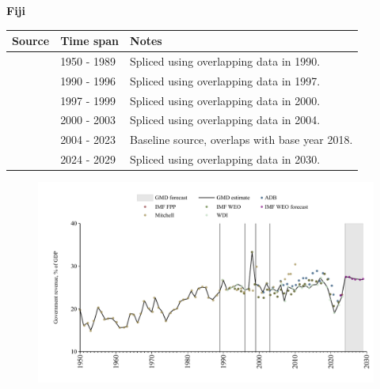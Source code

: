 \documentclass[12pt,a4paper,landscape]{article}
\begin{document}
\begin{adjustbox}{max totalsize={\paperwidth}{\paperheight},center}
\begin{minipage}[t][\textheight][t]{\textwidth}
\vspace*{0.5cm}
{}
\begin{center}
{\Large\bfseries Fiji}
\end{center}
\vspace{0.5cm}
\begin{table}[H]
\centering
\small
\begin{tabular}{|l|l|l|}
\hline
\textbf{Source} & \textbf{Time span} & \textbf{Notes} \\
\hline
\rowcolor{white}\cite{Mitchell}& 1950 - 1989 &Spliced using overlapping data in 1990.\\
\rowcolor{lightgray}\cite{WDI}& 1990 - 1996 &Spliced using overlapping data in 1997.\\
\rowcolor{white}\cite{IMF_WEO}& 1997 - 1999 &Spliced using overlapping data in 2000.\\
\rowcolor{lightgray}\cite{ADB}& 2000 - 2003 &Spliced using overlapping data in 2004.\\
\rowcolor{white}\cite{WDI}& 2004 - 2023 &Baseline source, overlaps with base year 2018.\\
\rowcolor{lightgray}\cite{IMF_WEO_forecast}& 2024 - 2029 &Spliced using overlapping data in 2030.\\
\hline
\end{tabular}
\end{table}
\begin{figure}[H]
\centering
\includegraphics[width=\textwidth,height=0.6\textheight,keepaspectratio]{graphs/FJI_govrev_GDP.pdf}
\end{figure}
\end{minipage}
\end{adjustbox}
\end{document}
